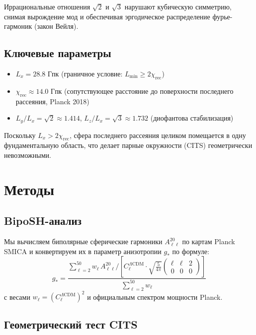 \documentclass[a4paper,11pt]{article}
\begin{document}
Иррациональные отношения $\sqrt{2}$ и $\sqrt{3}$ нарушают кубическую симметрию, снимая вырождение мод и обеспечивая эргодическое распределение фурье-гармоник (закон Вейля).

\subsection{Ключевые параметры}

\begin{itemize}
\item $L_x = 28.8$ Гпк (граничное условие: $L_{\min} \geq 2\chi_{\text{rec}}$)
\item $\chi_{\text{rec}} \approx 14.0$ Гпк (сопутствующее расстояние до поверхности последнего рассеяния, Planck 2018)
\item $L_y/L_x = \sqrt{2} \approx 1.414$, $L_z/L_x = \sqrt{3} \approx 1.732$ (диофантова стабилизация)
\end{itemize}

Поскольку $L_x > 2\chi_{\text{rec}}$, сфера последнего рассеяния целиком помещается в одну фундаментальную область, что делает парные окружности (CITS) геометрически невозможными.

\section{Методы}

\subsection{BipoSH-анализ}

Мы вычисляем биполярные сферические гармоники $A_{\ell\ell}^{20}$ по картам Planck SMICA и конвертируем их в параметр анизотропии $g_*$ по формуле:
\begin{equation}
g_* = \frac{\sum_{\ell=2}^{50} w_\ell \, A_{\ell\ell}^{20} / \left[C_\ell^{\Lambda\text{CDM}} \cdot \sqrt{\frac{5}{4\pi}} \begin{pmatrix} \ell & \ell & 2 \\ 0 & 0 & 0 \end{pmatrix}\right]}{\sum_{\ell=2}^{50} w_\ell}
\end{equation}
с весами $w_\ell = (C_\ell^{\Lambda\text{CDM}})^2$ и официальным спектром мощности Planck.

\subsection{Геометрический тест CITS}
\end{document}
